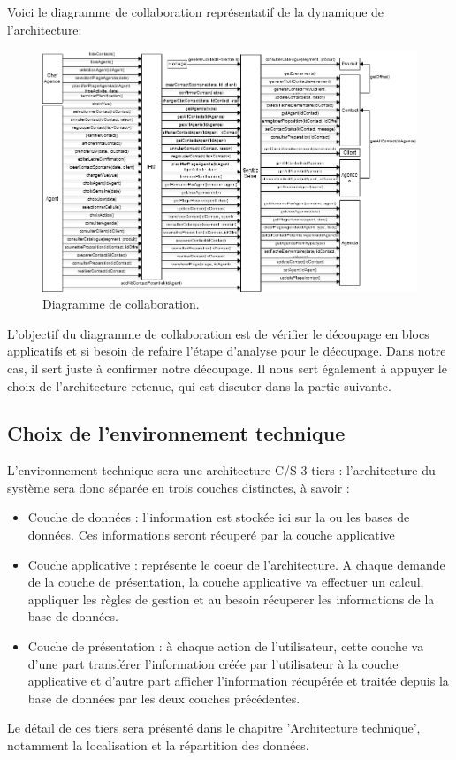 Voici le diagramme de collaboration représentatif de la dynamique de
l'architecture:

\begin{figure}[H]
\centering
\includegraphics[angle=90]{diagramme-collaboration.png}
\caption*{Diagramme de collaboration.}
\end{figure}

L'objectif du diagramme de collaboration est de vérifier le découpage en blocs applicatifs et si besoin de refaire l'étape d'analyse pour le découpage. Dans notre cas, il sert juste à confirmer notre découpage. Il nous sert également à appuyer le choix de l'architecture retenue, qui est discuter dans la partie suivante.


\subsection{Choix de l'environnement technique}
L'environnement technique sera une architecture C/S 3-tiers : l'architecture du système sera donc séparée en trois couches distinctes, à savoir :
\begin{itemize}
\item Couche de données : l'information est stockée ici sur la ou les bases de données. Ces informations seront récuperé par la couche applicative
\item Couche applicative : représente le coeur de l'architecture. A chaque demande de la couche de présentation, la couche applicative va effectuer un calcul, appliquer les règles de gestion et au besoin récuperer les informations de la base de données.
\item Couche de présentation : à chaque action de l'utilisateur, cette couche va d'une part transférer l'information créée par l'utilisateur à la couche applicative et d'autre part afficher l'information récupérée et traitée depuis la base de données par les deux couches précédentes.
\end{itemize}
Le détail de ces tiers sera présenté dans le chapitre 'Architecture technique', notamment la localisation et la répartition des données.
